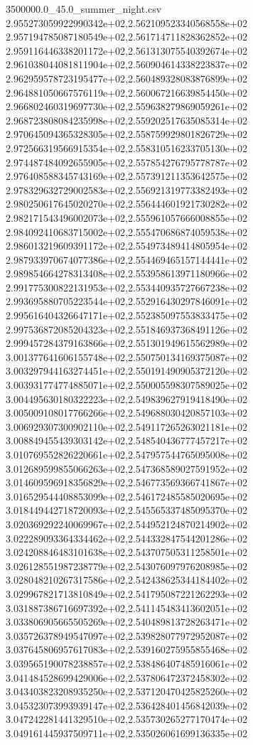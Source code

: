 \begin{filecontents*}{3500000.0_45.0_summer_night.csv}
2.955273059922990342e+02,2.562109523340568558e+02
2.957194785087180549e+02,2.561714711828362852e+02
2.959116446338201172e+02,2.561313075540392674e+02
2.961038044081811904e+02,2.560904614338223837e+02
2.962959578723195477e+02,2.560489328083876899e+02
2.964881050667576119e+02,2.560067216639854450e+02
2.966802460319697730e+02,2.559638279869059261e+02
2.968723808084235998e+02,2.559202517635085314e+02
2.970645094365328305e+02,2.558759929801826729e+02
2.972566319566915354e+02,2.558310516233705130e+02
2.974487484092655905e+02,2.557854276795778787e+02
2.976408588345743169e+02,2.557391211353642575e+02
2.978329632729002583e+02,2.556921319773382493e+02
2.980250617645020270e+02,2.556444601921730282e+02
2.982171543496002073e+02,2.555961057666008855e+02
2.984092410683715002e+02,2.555470686874059538e+02
2.986013219609391172e+02,2.554973489414805954e+02
2.987933970674077386e+02,2.554469465157144441e+02
2.989854664278313408e+02,2.553958613971180966e+02
2.991775300822131953e+02,2.553440935727667238e+02
2.993695880705223544e+02,2.552916430297846091e+02
2.995616404326647171e+02,2.552385097553833475e+02
2.997536872085204323e+02,2.551846937368491126e+02
2.999457284379163866e+02,2.551301949615562989e+02
3.001377641606155748e+02,2.550750134169375087e+02
3.003297944163274451e+02,2.550191490905372120e+02
3.003931774774885071e+02,2.550005598307589025e+02
3.004495630180322223e+02,2.549839627919418490e+02
3.005009108017766266e+02,2.549688030420857103e+02
3.006929307300902110e+02,2.549117265263021181e+02
3.008849455439303142e+02,2.548540436777457217e+02
3.010769552826220661e+02,2.547957544765095008e+02
3.012689599855066263e+02,2.547368589027591952e+02
3.014609596918356829e+02,2.546773569366741867e+02
3.016529544408853099e+02,2.546172485585020695e+02
3.018449442718720093e+02,2.545565337485095370e+02
3.020369292240069967e+02,2.544952124870214902e+02
3.022289093364334462e+02,2.544332847544201286e+02
3.024208846483101638e+02,2.543707505311258501e+02
3.026128551987238779e+02,2.543076097976208985e+02
3.028048210267317586e+02,2.542438625344184402e+02
3.029967821713810849e+02,2.541795087221262293e+02
3.031887386716697392e+02,2.541145483413602051e+02
3.033806905665505269e+02,2.540489813728263471e+02
3.035726378949547097e+02,2.539828077972952087e+02
3.037645806957617083e+02,2.539160275955855468e+02
3.039565190078238857e+02,2.538486407485916061e+02
3.041484528699429006e+02,2.537806472372458302e+02
3.043403823208935250e+02,2.537120470425825260e+02
3.045323073993939147e+02,2.536428401456842039e+02
3.047242281441329510e+02,2.535730265277170474e+02
3.049161445937509711e+02,2.535026061699136335e+02

\end{filecontents*}
